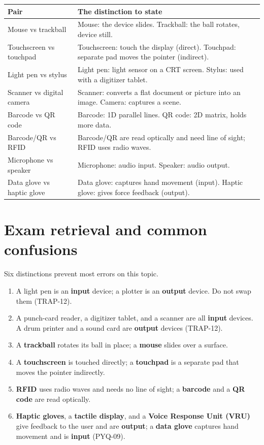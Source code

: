 \begin{center}
\begin{tabular}{p{}p{}}
\toprule
\textbf{Pair} & \textbf{The distinction to state} \\
\midrule
Mouse vs trackball & Mouse: the device slides. Trackball: the ball rotates, device still. \\
Touchscreen vs touchpad & Touchscreen: touch the display (direct). Touchpad: separate pad moves the pointer (indirect). \\
Light pen vs stylus & Light pen: light sensor on a CRT screen. Stylus: used with a digitizer tablet. \\
Scanner vs digital camera & Scanner: converts a flat document or picture into an image. Camera: captures a scene. \\
Barcode vs QR code & Barcode: 1D parallel lines. QR code: 2D matrix, holds more data. \\
Barcode/QR vs RFID & Barcode/QR are read optically and need line of sight; RFID uses radio waves. \\
Microphone vs speaker & Microphone: audio input. Speaker: audio output. \\
Data glove vs haptic glove & Data glove: captures hand movement (input). Haptic glove: gives force feedback (output). \\
\bottomrule
\end{tabular}
\end{center}

\section{Exam retrieval and common confusions}
Six distinctions prevent most errors on this topic.
\begin{enumerate}
  \item A light pen is an \textbf{input} device; a plotter is an \textbf{output}
    device. Do not swap them (TRAP-12).
  \item A punch-card reader, a digitizer tablet, and a scanner are all
    \textbf{input} devices. A drum printer and a sound card are
    \textbf{output} devices (TRAP-12).
  \item A \textbf{trackball} rotates its ball in place; a \textbf{mouse}
    slides over a surface.
  \item A \textbf{touchscreen} is touched directly; a \textbf{touchpad} is a
    separate pad that moves the pointer indirectly.
  \item \textbf{RFID} uses radio waves and needs no line of sight; a
    \textbf{barcode} and a \textbf{QR code} are read optically.
  \item \textbf{Haptic gloves}, a \textbf{tactile display}, and a
    \textbf{Voice Response Unit (VRU)} give feedback to the user and are
    \textbf{output}; a \textbf{data glove} captures hand movement and is
    \textbf{input} (PYQ-09).
\end{enumerate}


